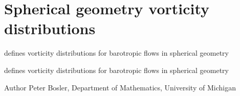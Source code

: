 \hypertarget{group__BVEVorticity}{\section{Spherical geometry vorticity distributions}
\label{group__BVEVorticity}
}


defines vorticity distributions for barotropic flows in spherical geometry  


defines vorticity distributions for barotropic flows in spherical geometry 

\begin{DoxyAuthor}{Author}
Peter Bosler, Department of Mathematics, University of Michigan 
\end{DoxyAuthor}
